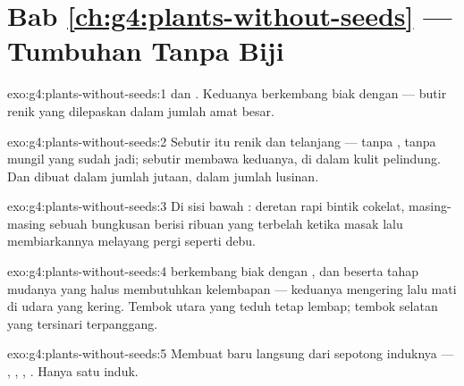 \section*{Bab \ref{ch:g4:plants-without-seeds} --- Tumbuhan Tanpa Biji}

\begin{solution}{exo:g4:plants-without-seeds:1}
 dan . Keduanya berkembang biak dengan  ---
butir renik yang dilepaskan dalam jumlah amat besar.
\end{solution}

\begin{solution}{exo:g4:plants-without-seeds:2}
Sebutir  itu renik dan telanjang --- tanpa ,
tanpa  mungil yang sudah jadi; sebutir  membawa keduanya,
di dalam kulit pelindung. Dan  dibuat dalam jumlah jutaan, 
dalam jumlah lusinan.
\end{solution}

\begin{solution}{exo:g4:plants-without-seeds:3}
Di sisi bawah : deretan rapi bintik cokelat, masing-masing
sebuah bungkusan berisi ribuan  yang terbelah ketika masak lalu
membiarkannya melayang pergi seperti debu.
\end{solution}

\begin{solution}{exo:g4:plants-without-seeds:4}
 berkembang biak dengan , dan  beserta tahap mudanya
yang halus membutuhkan kelembapan --- keduanya mengering lalu mati di
udara yang kering. Tembok utara yang teduh tetap lembap; tembok
selatan yang tersinari terpanggang.
\end{solution}

\begin{solution}{exo:g4:plants-without-seeds:5}
Membuat  baru langsung dari sepotong  induknya ---
, , , . Hanya satu induk.
\end{solution}


